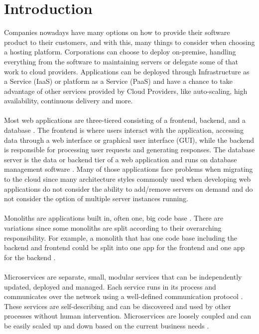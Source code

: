 \documentclass[BIF,Bachelor,nenglish]{twbook}%
\begin{document}
\maketitle

%
%
\chapter{Introduction}
Companies nowadays have many options on how to provide their software product to their customers, and with this, many things to consider when choosing a hosting platform. Corporations can choose to deploy on-premise, handling everything from the software to maintaining servers or delegate some of that work to cloud providers. Applications can be deployed through Infrastructure as a Service (IaaS) \cite{microIaas} or platform as a Service (PaaS) \cite{redPaas} and have a chance to take advantage of other services provided by Cloud Providers, like auto-scaling, high availability, continuous delivery and more.
\\
\\
Most web applications are three-tiered consisting of a frontend, backend, and a database \cite{liu2005}. The frontend is where users interact with the application, accessing data through a web interface or graphical user interface (GUI), while the backend is responsible for processing user requests and generating responses. The database server is the data or backend tier of a web application and runs on database management software \cite{ibm3t}. Many of those applications face problems when migrating to the cloud since many architecture styles commonly used when developing web applications do not consider the ability to add/remove servers on demand and do not consider the option of multiple server instances running.
\\
\\
Monoliths are applications built in, often one, big code base \cite{migmonomicro}. There are variations since some monoliths are split according to their overarching responsibility. For example, a monolith that has one code base including the backend and frontend could be split into one app for the frontend and one app for the backend \cite{chllng}.
\\
\\
Microservices are separate, small, modular services that can be independently updated, deployed and managed. Each service runs in its process and communicates over the network using a well-defined communication protocol \cite{fow2014}. These services are self-describing and can be discovered and used by other processes without human intervention. Microservices are loosely coupled and can be easily scaled up and down based on the current business needs \cite{ade2017}.
\end{document}
